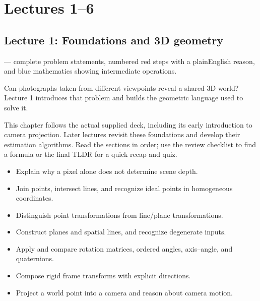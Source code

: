 \documentclass[letterpaper,11pt,english,openany,oneside]{jupyterBook}
\begin{document}
\sphinxstepscope


\setcounter{chapter}{0}\setcounter{secnumdepth}{2}
\part{Lectures 1–6}

\sphinxstepscope


\chapter{Lecture 1: Foundations and 3D geometry}
\label{\detokenize{lectures/lecture01/index:lecture-1-foundations-and-3d-geometry}}\label{\detokenize{lectures/lecture01/index:lecture01}}\label{\detokenize{lectures/lecture01/index::doc}}
\sphinxAtStartPar
{} — complete problem statements, numbered red steps with a plain\sphinxhyphen{}English reason, and blue mathematics showing intermediate operations.

\sphinxAtStartPar
Can photographs taken from different viewpoints reveal a shared 3D world? Lecture 1 introduces that problem and builds the geometric language used to solve it.

\sphinxAtStartPar
This chapter follows the actual supplied deck, including its early introduction to camera projection. Later lectures revisit these foundations and develop their estimation algorithms. Read the sections in order; use the review checklist to find a formula or the final TLDR for a quick recap and quiz.

\sphinxAtStartPar
{}
\begin{itemize}
\item {}
\sphinxAtStartPar
Explain why a pixel alone does not determine scene depth.

\item {}
\sphinxAtStartPar
Join points, intersect lines, and recognize ideal points in homogeneous coordinates.

\item {}
\sphinxAtStartPar
Distinguish point transformations from line/plane transformations.

\item {}
\sphinxAtStartPar
Construct planes and spatial lines, and recognize degenerate inputs.

\item {}
\sphinxAtStartPar
Apply and compare rotation matrices, ordered angles, axis–angle, and quaternions.

\item {}
\sphinxAtStartPar
Compose rigid frame transforms with explicit directions.

\item {}
\sphinxAtStartPar
Project a world point into a camera and reason about camera motion.

\end{itemize}
\end{document}
